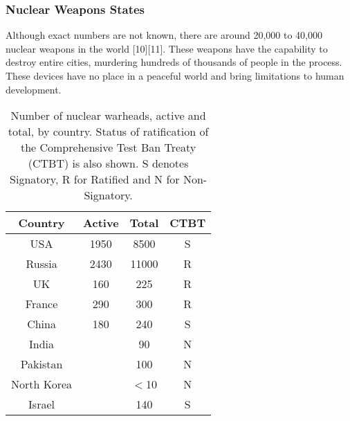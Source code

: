 \documentclass[twoside,titlepage,11pt,twocolumn,a4paper]{article}
\begin{document}
\subsubsection{Nuclear Weapons States}
Although exact numbers are not known, there are around 20,000 to
40,000 nuclear weapons in the world [10][11]. These weapons have the
capability to destroy entire cities, murdering hundreds of thousands
of people in the process. These devices have no place in a peaceful
world and bring limitations to human development.

\begin{table}
  \begin{tabular}{|c|c|c|c|}
    \hline
    Country	& Active& Total		& CTBT	\\
    \hline
    USA		& 1950 	& 8500		& S	\\
    Russia	& 2430 	& 11000		& R	\\
    UK		& 160 	& 225		& R	\\
    France	& 290	& 300		& R	\\
    China	& 180	& 240		& S	\\
    India	&	& 90		& N	\\
    Pakistan	&	& 100		& N	\\
    North Korea	&	& \(<\)10	& N	\\
    Israel	&	& 140		& S	\\
    \hline
  \end{tabular}
  \caption{Number of nuclear warheads, active and total, by
    country. Status of ratification of the Comprehensive Test Ban
    Treaty (CTBT) is also shown. S denotes Signatory, R for
    Ratified and N for Non-Signatory.}
  \label{tab:NWSwarheadsCTBT}
\end{table}
\end{document}
